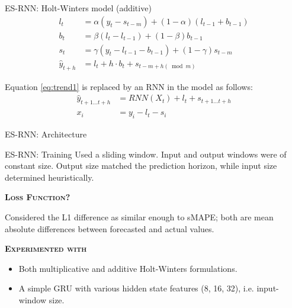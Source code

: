 \documentclass[aspectratio=169, 12pt]{beamer}
\begin{document}
\begin{frame}{ES-RNN: Holt-Winters model (additive)}
\begin{align}
    l_t &= \alpha (y_t - s_{t-m}) + (1 - \alpha) (l_{t-1} + b_{t-1}) \label{eq:level1}\\
    b_t &= \beta (l_t - l_{t-1}) + (1- \beta) b_{t-1} \label{eq:trend1}\\ 
    s_t &= \gamma (y_t - l_{t-1} - b_{t-1}) + (1-\gamma) s_{t-m} \label{eq:season1}\\
    \hat{y}_{t+h} &= l_t + h \cdot b_t + s_{t-m+h (\bmod m)} \label{eq:predEq1}
\end{align}

Equation \ref{eq:trend1} is replaced by an RNN in the model as follows:
\begin{align}
    \hat{y}_{t+1 \dots t+h} &= RNN(X_t) + l_t + s_{t+1 \dots t+h} \label{eq:modifiedEq1}\\
    x_i &= y_i - l_t - s_i \label{eq:x1}
\end{align}

\end{frame}

\begin{frame}[fragile]{ES-RNN: Architecture}
    \begin{figure}[htbp]
    \centering
    \def\svgwidth{\columnwidth}
    
    \end{figure}
\end{frame}

\begin{frame}{ES-RNN: Training}
Used a sliding window. Input and output windows were of constant size. Output size matched the prediction horizon, while input size determined heuristically.
\begin{center}
    \textsc{\textbf{Loss Function?}}
\end{center}
Considered the L1 difference as similar enough to sMAPE; both are mean absolute differences between forecasted and actual values.
\begin{center}
    \textsc{\textbf{Experimented with}}
\end{center}
    \begin{itemize}
        \item Both multiplicative and additive Holt-Winters formulations.
        \item A simple GRU with various hidden state features (8, 16, 32), i.e. input-window size.
    \end{itemize}
\end{frame}
\end{document}
